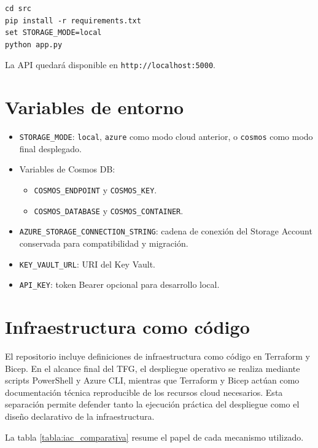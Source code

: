 \begin{verbatim}
cd src
pip install -r requirements.txt
set STORAGE_MODE=local
python app.py
\end{verbatim}

La API quedará disponible en \texttt{http://localhost:5000}.

\section{Variables de entorno}

\begin{itemize}
    \item \texttt{STORAGE\_MODE}: \texttt{local}, \texttt{azure} como modo cloud anterior, o \texttt{cosmos} como modo final desplegado.
    \item Variables de Cosmos DB:
    \begin{itemize}
        \item \texttt{COSMOS\_ENDPOINT} y \texttt{COSMOS\_KEY}.
        \item \texttt{COSMOS\_DATABASE} y \texttt{COSMOS\_CONTAINER}.
    \end{itemize}
    \item \texttt{AZURE\_STORAGE\_CONNECTION\_STRING}: cadena de conexión del Storage Account conservada para compatibilidad y migración.
    \item \texttt{KEY\_VAULT\_URL}: URI del Key Vault.
    \item \texttt{API\_KEY}: token Bearer opcional para desarrollo local.
\end{itemize}


\section{Infraestructura como código}

El repositorio incluye definiciones de infraestructura como código en Terraform y Bicep. En el alcance final del TFG, el despliegue operativo se realiza mediante scripts PowerShell y Azure CLI, mientras que Terraform y Bicep actúan como documentación técnica reproducible de los recursos cloud necesarios. Esta separación permite defender tanto la ejecución práctica del despliegue como el diseño declarativo de la infraestructura.

La tabla \ref{tabla:iac_comparativa} resume el papel de cada mecanismo utilizado.

